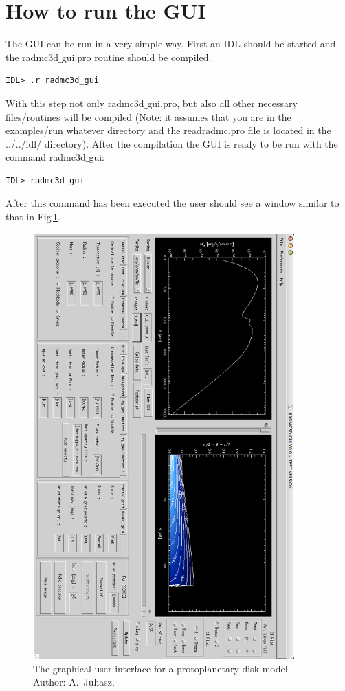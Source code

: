 \documentclass{report}
\begin{document}
\section{How to run the GUI}
The GUI can be run in a very simple way. First an IDL should be started and 
the radmc3d$\_$gui.pro routine should be compiled.
\begin{verbatim}
IDL> .r radmc3d_gui
\end{verbatim}
With this step not only radmc3d$\_$gui.pro, but also all other necessary
files/routines will be compiled (Note: it assumes that you are in the
examples/run$\_$whatever directory and the readradmc.pro file is located in
the ../../idl/ directory). After the compilation the GUI is ready to be run
with the command radmc3d$\_$gui:
\begin{verbatim}
IDL> radmc3d_gui
\end{verbatim}
After this command has been executed the user should see a window similar to
that in Fig\,\ref{fig-gui-ppdisk}.
%
\begin{figure}
\centerline{\includegraphics[angle=90,width=0.9\textwidth]{gui_ppdisk.eps}}
\caption{\label{fig-gui-ppdisk} The graphical user interface for a
  protoplanetary disk model. Author: A.~Juhasz.}
\end{figure}
%
\end{document}
